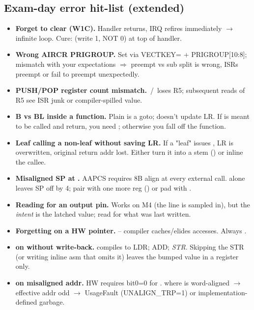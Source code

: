 \subsection{Exam-day error hit-list (extended)}
\begin{itemize}
\item \textbf{Forget to clear  (W1C).} Handler returns, IRQ refires immediately $\to$ infinite loop. Cure:  (write 1, NOT 0) at top of handler.
\item \textbf{Wrong AIRCR PRIGROUP.} Set via VECTKEY= + PRIGROUP[10:8]; mismatch with your  expectations $\Rightarrow$ preempt vs sub split is wrong, ISRs preempt or fail to preempt unexpectedly.
\item \textbf{PUSH/POP register count mismatch.} \,/\, loses R5; subsequent reads of R5 see ISR junk or compiler-spilled value.
\item \textbf{B vs BL inside a function.} Plain  is a goto; doesn't update LR. If  is meant to be called and return, you need ; otherwise you fall off the function.
\item \textbf{Leaf calling a non-leaf without saving LR.} If a "leaf" issues , LR is overwritten, original return addr lost. Either turn it into a stem () or inline the callee.
\item \textbf{Misaligned SP at .} AAPCS requires 8B align at every external call.  alone leaves SP off by 4; pair with one more reg () or pad with .
\item \textbf{Reading  for an output pin.} Works on M4 (the line is sampled in), but the \emph{intent} is the latched value; read  for what was last written.
\item \textbf{Forgetting  on a HW pointer.}  -- compiler caches/elides accesses. Always .
\item \textbf{\cee{++} on  without write-back.}  compiles to LDR; ADD; \emph{STR}. Skipping the STR (or writing inline asm that omits it) leaves the bumped value in a register only.
\item \textbf{ on misaligned addr.} HW requires bit0=0 for . \asm{[Ra,\#1]} where  is word-aligned $\to$ effective addr odd $\to$ UsageFault (UNALIGN\_TRP=1) or implementation-defined garbage.

\end{itemize}
